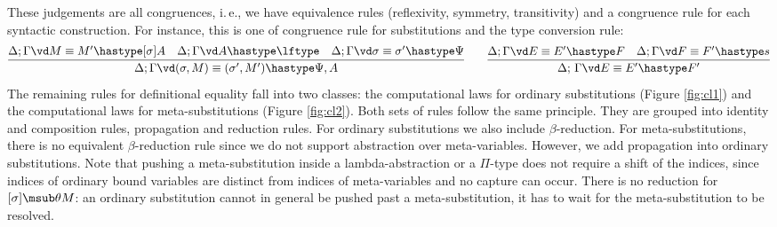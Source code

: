 \documentclass[copyright,creativecommons]{eptcs}
\newcommand{\abbrev}[1]{#1} \newcommand{\cf}{\abbrev{cf.}\ }
\newcommand{\ie}{\abbrev{i.\,e.}}
\newcommand{\esub}[1]{[#1]}
\begin{document}
These judgements are all congruences, \ie, we have equivalence rules
(reflexivity, symmetry, transitivity) and a congruence rule for each
syntactic construction.  For instance, this is one of congruence rule for
substitutions and the type conversion rule:
\[
 \infer{\Delta; \Gamma \vd (\sigma, M) \equiv (\sigma', M')
   \hastype \Psi, A}{\Delta; \Gamma \vd M \equiv M' \hastype [\sigma]A
   & \Delta ; \Gamma \vd A \hastype \lftype 
   & \Delta; \Gamma \vd \sigma \equiv \sigma' \hastype \Psi}
\qquad
\infer{\Delta;\,\Gamma \vd E \equiv E' \hastype F'}{
  \Delta; \Gamma \vd E \equiv E' \hastype F & 
  \Delta; \Gamma \vd F \equiv F' \hastype s}
\]
The remaining rules for definitional equality fall into two classes:
the computational laws for ordinary substitutions (Figure
\ref{fig:cl1}) and the computational laws for meta-substitutions
(Figure \ref{fig:cl2}). Both sets of rules follow the same
principle. They are grouped into identity and composition rules,
propagation and reduction rules. For ordinary substitutions we also
include $\beta$-reduction.  For meta-substitutions, there is no
equivalent $\beta$-reduction rule since we do not support abstraction
over meta-variables. However, we add propagation into ordinary
substitutions.  Note that pushing a meta-substitution inside a
lambda-abstraction or a $\Pi$-type does not require a shift of the
indices, since indices of ordinary bound variables are distinct from
indices of meta-variables and no capture can occur.
There is no reduction for $\esub \sigma \msub \theta M$: an
ordinary substitution cannot in general be pushed past a meta-substitution, it
has to wait for the meta-substitution to be resolved.
\end{document}
